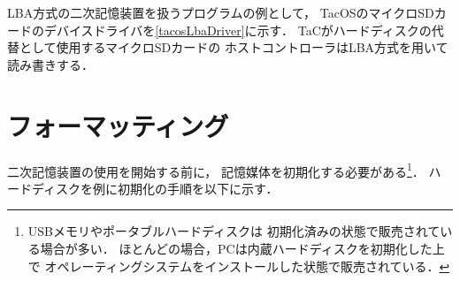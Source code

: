 LBA方式の二次記憶装置を扱うプログラムの例として，
TacOSのマイクロSDカードのデバイスドライバを\ref{tacosLbaDriver}に示す．
TaCがハードディスクの代替として使用するマイクロSDカードの
ホストコントローラはLBA方式を用いて読み書きする．

\section{フォーマッティング}
二次記憶装置の使用を開始する前に，
記憶媒体を初期化する必要がある\footnote{
USBメモリやポータブルハードディスクは
初期化済みの状態で販売されている場合が多い．
ほとんどの場合，PCは内蔵ハードディスクを初期化した上で
オペレーティングシステムをインストールした状態で販売されている．
}．
ハードディスクを例に初期化の手順を以下に示す．

